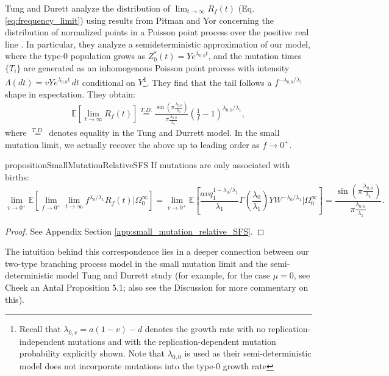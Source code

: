 \documentclass{article}
\numberwithin{equation}{section}
\begin{document}
Tung and Durett analyze the distribution of $\lim_{t\to\infty}R_f(t
)$ (Eq. \ref{eq:frequency_limit}) using results from Pitman and Yor concerning the distribution of normalized points in a Poisson point process over the positive real line \cite{tung,pitman1997}. In particular, they analyze a semideterministic approximation of our model, where the type-$0$ population grows as $Z_0^*(t)=Ye^{\lambda_{0,0} t}$, and the mutation times $\{T_i\}$ are generated as an inhomogenous Poisson point process with intensity $\Lambda(dt)=vYe^{\lambda_{0,0} t}\,dt$ conditional on $Y$\footnote{Recall that $\lambda_{0,v}=a(1-v)-d$ denotes the growth rate with no replication-independent mutations and with the replication-dependent mutation probability explicitly shown. Note that $\lambda_{0,0}$ is used as their semi-deterministic model does not incorporate mutations into the type-0 growth rate}. They find that the tail follows a $f^{-\lambda_{0,0}/\lambda_1}$ shape in expectation. They obtain:
\begin{align}
  \mathbb{E}[\lim_{t\to\infty}R_f(t)]\overset{T.D.}{=}\frac{\sin\left(\pi\frac{\lambda_{0,0}}{\lambda_1}\right)}{\pi\frac{\lambda_{0,0}}{\lambda_1}}\left(\frac{1}{f}-1\right)^{\lambda_{0,0}/\lambda_1},\label{eq:tung_durrett}
\end{align}
where $\overset{T.D.}{=}$ denotes equality in the Tung and Durrett model. In the small mutation limit, we actually recover the above up to leading order as $f\to 0^+$.
\begin{restatable}{proposition}{SmallMutationRelativeSFS}
  If mutations are only associated with births:
  \[\lim_{v\to0^+}\mathbb{E}\left[\lim_{f\to0^+}\lim_{t\to\infty}f^{\lambda_0/\lambda_1}R_{f}(t)|\Omega_0^\infty\right]=\lim_{v\to 0^+}\mathbb{E}\left[\frac{av q_1^{1-\lambda_0/\lambda_1}}{\lambda_1}\Gamma(\frac{\lambda_0}{\lambda_1})YW^{-\lambda_0/\lambda_1}|\Omega_0^\infty\right]=\frac{\sin\left(\pi\frac{\lambda_{0,0}}{\lambda_1}\right)}{\pi\frac{\lambda_{0,0}}{\lambda_1}}.\]\label{prop:small_mutation_relative_SFS}
\end{restatable}
\begin{proof}
  See Appendix Section \ref{app:small_mutation_relative_SFS}.
\end{proof}

The intuition behind this correspondence lies in a deeper connection between our two-type branching process model in the small mutation limit and the semi-deterministic model Tung and Durrett study (for example, for the case $\mu=0$, see Cheek an Antal \cite{cheek2018} Proposition 5.1; also see the Discussion for more commentary on this).
\end{document}
